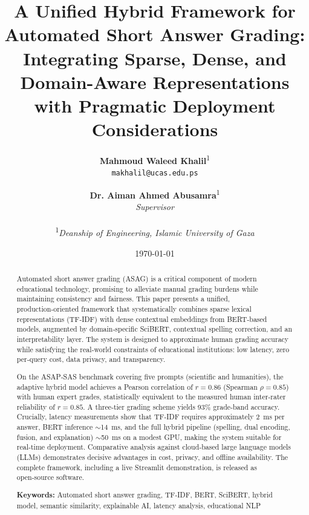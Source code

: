 \documentclass[11pt,a4paper]{article}
\title{\textbf{A Unified Hybrid Framework for Automated Short Answer Grading: \\
Integrating Sparse, Dense, and Domain-Aware Representations \\
with Pragmatic Deployment Considerations}}
\author{
    \textbf{Mahmoud Waleed Khalil}\textsuperscript{1} \\
    \texttt{makhalil@ucas.edu.ps} \\
    \and
    \textbf{Dr. Aiman Ahmed Abusamra}\textsuperscript{1} \\
    \textit{Supervisor} \\
    \vspace{1em} \\
    \textsuperscript{1}\textit{Deanship of Engineering, Islamic University of Gaza}
}
\date{\today}
\begin{document}
\maketitle

\begin{abstract}
\noindent Automated short answer grading (ASAG) is a critical component of modern educational technology, promising to alleviate manual grading burdens while maintaining consistency and fairness. This paper presents a unified, production‑oriented framework that systematically combines sparse lexical representations (TF‑IDF) with dense contextual embeddings from BERT‑based models, augmented by domain‑specific SciBERT, contextual spelling correction, and an interpretability layer. The system is designed to approximate human grading accuracy while satisfying the real‑world constraints of educational institutions: low latency, zero per‑query cost, data privacy, and transparency.

On the ASAP‑SAS benchmark covering five prompts (scientific and humanities), the adaptive hybrid model achieves a Pearson correlation of $r = 0.86$ (Spearman $\rho = 0.85$) with human expert grades, statistically equivalent to the measured human inter‑rater reliability of $r = 0.85$. A three‑tier grading scheme yields 93\% grade‑band accuracy. Crucially, latency measurements show that TF‑IDF requires approximately 2~ms per answer, BERT inference $\sim$14~ms, and the full hybrid pipeline (spelling, dual encoding, fusion, and explanation) $\sim$50~ms on a modest GPU, making the system suitable for real‑time deployment. Comparative analysis against cloud‑based large language models (LLMs) demonstrates decisive advantages in cost, privacy, and offline availability. The complete framework, including a live Streamlit demonstration, is released as open‑source software.

\vspace{4pt}
\noindent\textbf{Keywords:} Automated short answer grading, TF‑IDF, BERT, SciBERT, hybrid model, semantic similarity, explainable AI, latency analysis, educational NLP
\end{abstract}

\end{document}
